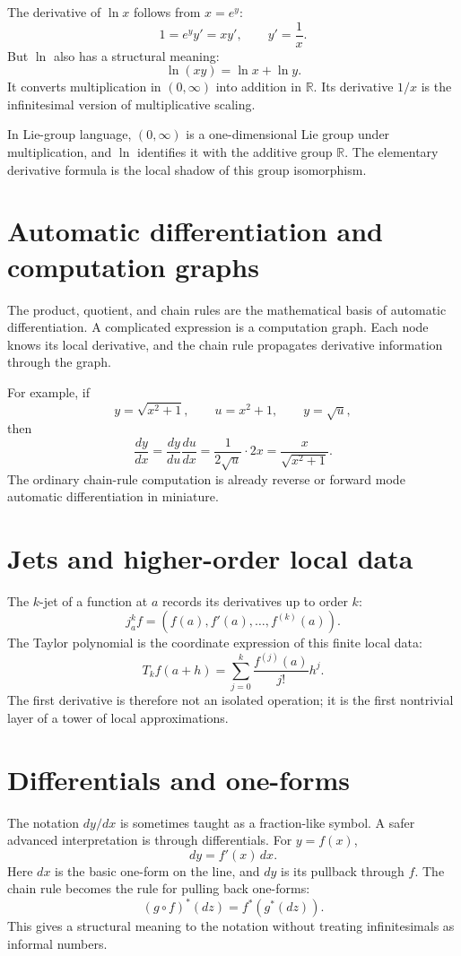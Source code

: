 The derivative of \(\ln x\) follows from \(x=e^y\):
\[
  1=e^y y'=xy',\qquad y'=\frac1x.
\]
But \(\ln\) also has a structural meaning:
\[
  \ln(xy)=\ln x+\ln y.
\]
It converts multiplication in \((0,\infty)\) into addition in \(\mathbb R\).  Its derivative \(1/x\) is the infinitesimal version of multiplicative scaling.

In Lie-group language, \((0,\infty)\) is a one-dimensional Lie group under multiplication, and \(\ln\) identifies it with the additive group \(\mathbb R\).  The elementary derivative formula is the local shadow of this group isomorphism.

\section{Automatic differentiation and computation graphs}

The product, quotient, and chain rules are the mathematical basis of automatic differentiation.  A complicated expression is a computation graph.  Each node knows its local derivative, and the chain rule propagates derivative information through the graph.

For example, if
\[
  y=\sqrt{x^2+1},\qquad u=x^2+1,\qquad y=\sqrt u,
\]
then
\[
  \frac{dy}{dx}=\frac{dy}{du}\frac{du}{dx}=\frac{1}{2\sqrt u}\cdot2x=\frac{x}{\sqrt{x^2+1}}.
\]
The ordinary chain-rule computation is already reverse or forward mode automatic differentiation in miniature.

\section{Jets and higher-order local data}

The \(k\)-jet of a function at \(a\) records its derivatives up to order \(k\):
\[
  j_a^k f=(f(a),f'(a),\ldots,f^{(k)}(a)).
\]
The Taylor polynomial is the coordinate expression of this finite local data:
\[
  T_kf(a+h)=\sum_{j=0}^k \frac{f^{(j)}(a)}{j!}h^j.
\]
The first derivative is therefore not an isolated operation; it is the first nontrivial layer of a tower of local approximations.

\section{Differentials and one-forms}

The notation \(dy/dx\) is sometimes taught as a fraction-like symbol.  A safer advanced interpretation is through differentials.  For \(y=f(x)\),
\[
  dy=f'(x)\,dx.
\]
Here \(dx\) is the basic one-form on the line, and \(dy\) is its pullback through \(f\).  The chain rule becomes the rule for pulling back one-forms:
\[
  (g\circ f)^*(dz)=f^*(g^*(dz)).
\]
This gives a structural meaning to the notation without treating infinitesimals as informal numbers.

